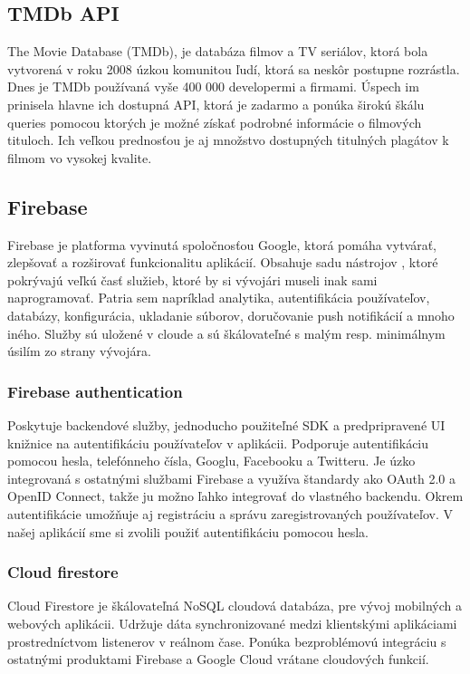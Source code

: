 \subsection{TMDb API}
The Movie Database (TMDb), je databáza filmov a TV seriálov, ktorá bola vytvorená v roku 2008 úzkou komunitou ľudí, ktorá sa neskôr postupne rozrástla. Dnes je TMDb používaná vyše 400 000 developermi a firmami. Úspech im prinisela hlavne ich dostupná API, ktorá je zadarmo a ponúka širokú škálu queries pomocou ktorých je možné získať podrobné informácie o filmových tituloch. Ich veľkou prednosťou je aj množstvo dostupných titulných plagátov k filmom vo vysokej kvalite. \\

\subsection{Firebase}
Firebase je platforma vyvinutá spoločnosťou Google, ktorá pomáha vytvárať, zlepšovať a rozširovať funkcionalitu aplikácií. Obsahuje sadu nástrojov , ktoré pokrývajú veľkú časť služieb, ktoré by si vývojári museli inak sami naprogramovať. Patria sem napríklad analytika, autentifikácia používateľov, databázy, konfigurácia, ukladanie súborov, doručovanie push notifikácií a mnoho iného. Služby sú uložené v cloude a sú škálovateľné s malým resp. minimálnym úsilím zo strany vývojára. \\

\subsubsection{Firebase authentication}
Poskytuje backendové služby, jednoducho použiteľné SDK a predpripravené UI knižnice na autentifikáciu používateľov v aplikácii. Podporuje autentifikáciu pomocou hesla, telefónneho čísla, Googlu, Facebooku a Twitteru. Je úzko integrovaná s ostatnými službami Firebase a využíva  štandardy ako OAuth 2.0 a OpenID Connect, takže ju možno ľahko integrovať do vlastného backendu. Okrem autentifikácie umožňuje aj registráciu a správu zaregistrovaných používateľov. V našej aplikácií sme si zvolili použiť autentifikáciu pomocou hesla. \\

\subsubsection{Cloud firestore}
Cloud Firestore je škálovateľná NoSQL cloudová databáza, pre vývoj mobilných a webových aplikácii. Udržuje dáta synchronizované medzi klientskými aplikáciami prostredníctvom listenerov v reálnom čase. Ponúka bezproblémovú integráciu s ostatnými produktami Firebase a Google Cloud vrátane cloudových funkcií. 

